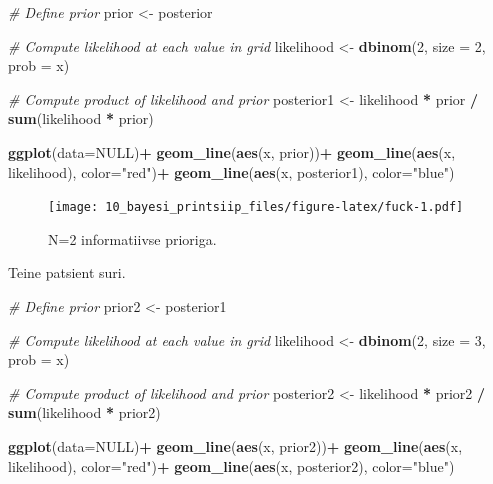 \documentclass[]{book}
\newenvironment{Shaded}{\begin{snugshade}}{\end{snugshade}}
\newcommand{\KeywordTok}[1]{\textcolor[rgb]{0.13,0.29,0.53}{\textbf{#1}}}
\newcommand{\DataTypeTok}[1]{\textcolor[rgb]{0.13,0.29,0.53}{#1}}
\newcommand{\DecValTok}[1]{\textcolor[rgb]{0.00,0.00,0.81}{#1}}
\newcommand{\StringTok}[1]{\textcolor[rgb]{0.31,0.60,0.02}{#1}}
\newcommand{\CommentTok}[1]{\textcolor[rgb]{0.56,0.35,0.01}{\textit{#1}}}
\newcommand{\OtherTok}[1]{\textcolor[rgb]{0.56,0.35,0.01}{#1}}
\newcommand{\OperatorTok}[1]{\textcolor[rgb]{0.81,0.36,0.00}{\textbf{#1}}}
\newcommand{\NormalTok}[1]{#1}
\begin{document}
\begin{Shaded}
\begin{Highlighting}[]
\CommentTok{# Define prior}
\NormalTok{prior <-}\StringTok{ }\NormalTok{posterior}

\CommentTok{# Compute likelihood at each value in grid}
\NormalTok{likelihood <-}\StringTok{ }\KeywordTok{dbinom}\NormalTok{(}\DecValTok{2}\NormalTok{, }\DataTypeTok{size =} \DecValTok{2}\NormalTok{, }\DataTypeTok{prob =}\NormalTok{ x)}

\CommentTok{# Compute product of likelihood and prior}
\NormalTok{posterior1 <-}\StringTok{ }\NormalTok{likelihood }\OperatorTok{*}\StringTok{ }\NormalTok{prior }\OperatorTok{/}\StringTok{ }\KeywordTok{sum}\NormalTok{(likelihood }\OperatorTok{*}\StringTok{ }\NormalTok{prior)}

\KeywordTok{ggplot}\NormalTok{(}\DataTypeTok{data=}\OtherTok{NULL}\NormalTok{)}\OperatorTok{+}
\StringTok{  }\KeywordTok{geom_line}\NormalTok{(}\KeywordTok{aes}\NormalTok{(x, prior))}\OperatorTok{+}
\StringTok{  }\KeywordTok{geom_line}\NormalTok{(}\KeywordTok{aes}\NormalTok{(x, likelihood), }\DataTypeTok{color=}\StringTok{"red"}\NormalTok{)}\OperatorTok{+}
\StringTok{  }\KeywordTok{geom_line}\NormalTok{(}\KeywordTok{aes}\NormalTok{(x, posterior1), }\DataTypeTok{color=}\StringTok{"blue"}\NormalTok{)}
\end{Highlighting}
\end{Shaded}

\begin{figure}
\centering
\texttt{[image: 10\_bayesi\_printsiip\_files/figure-latex/fuck-1.pdf]}
\caption{\label{fig:fuck}N=2 informatiivse prioriga.}
\end{figure}

Teine patsient suri.



\begin{Shaded}
\begin{Highlighting}[]
\CommentTok{# Define prior}
\NormalTok{prior2 <-}\StringTok{ }\NormalTok{posterior1}

\CommentTok{# Compute likelihood at each value in grid}
\NormalTok{likelihood <-}\StringTok{ }\KeywordTok{dbinom}\NormalTok{(}\DecValTok{2}\NormalTok{, }\DataTypeTok{size =} \DecValTok{3}\NormalTok{, }\DataTypeTok{prob =}\NormalTok{ x)}

\CommentTok{# Compute product of likelihood and prior}
\NormalTok{posterior2 <-}\StringTok{ }\NormalTok{likelihood }\OperatorTok{*}\StringTok{ }\NormalTok{prior2 }\OperatorTok{/}\StringTok{ }\KeywordTok{sum}\NormalTok{(likelihood }\OperatorTok{*}\StringTok{ }\NormalTok{prior2)}

\KeywordTok{ggplot}\NormalTok{(}\DataTypeTok{data=}\OtherTok{NULL}\NormalTok{)}\OperatorTok{+}
\StringTok{  }\KeywordTok{geom_line}\NormalTok{(}\KeywordTok{aes}\NormalTok{(x, prior2))}\OperatorTok{+}
\StringTok{  }\KeywordTok{geom_line}\NormalTok{(}\KeywordTok{aes}\NormalTok{(x, likelihood), }\DataTypeTok{color=}\StringTok{"red"}\NormalTok{)}\OperatorTok{+}
\StringTok{  }\KeywordTok{geom_line}\NormalTok{(}\KeywordTok{aes}\NormalTok{(x, posterior2), }\DataTypeTok{color=}\StringTok{"blue"}\NormalTok{)}
\end{Highlighting}
\end{Shaded}
\end{document}
